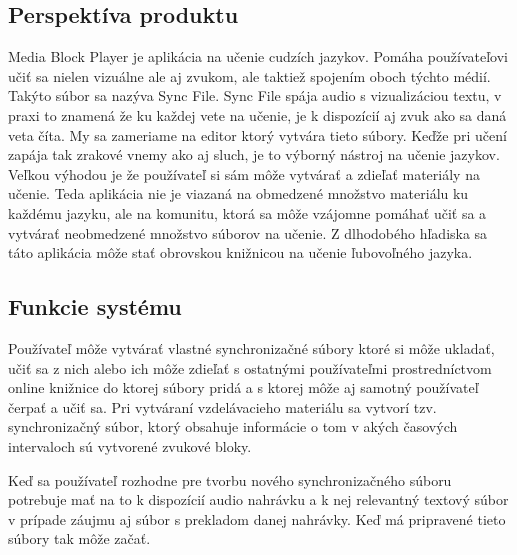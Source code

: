 \documentclass{article}
\begin{document}
\subsection{Perspektíva produktu }
Media Block Player je aplikácia na učenie cudzích jazykov. Pomáha používateľovi učiť sa nielen vizuálne ale aj zvukom, ale taktiež spojením oboch týchto médií. Takýto súbor sa nazýva Sync File. Sync File spája audio s vizualizáciou textu, v praxi to znamená že ku každej vete na učenie, je k dispozícií aj zvuk ako sa daná veta číta. My sa zameriame na editor ktorý vytvára tieto súbory. Keďže pri učení zapája tak zrakové vnemy ako aj sluch, je to výborný nástroj na učenie jazykov. Veľkou výhodou je že používateľ si sám môže vytvárať a zdieľať materiály na učenie. Teda aplikácia nie je viazaná na obmedzené množstvo materiálu ku každému jazyku, ale na komunitu, ktorá sa môže vzájomne pomáhať učiť sa a vytvárať neobmedzené množstvo súborov na učenie. Z dlhodobého hľadiska sa táto aplikácia môže stať obrovskou knižnicou na učenie ľubovoľného jazyka.

\subsection{Funkcie systému}
Používateľ môže vytvárať vlastné synchronizačné súbory ktoré si môže ukladať, učiť sa z nich alebo ich môže zdieľať s ostatnými používateľmi prostredníctvom online knižnice do ktorej súbory pridá a s ktorej môže aj samotný používateľ čerpať a učiť sa. Pri vytváraní vzdelávacieho materiálu sa vytvorí tzv. synchronizačný súbor, ktorý obsahuje informácie o tom v akých časových intervaloch sú vytvorené zvukové bloky.

Keď sa používateľ rozhodne pre tvorbu nového synchronizačného súboru potrebuje mať na to k dispozícií audio nahrávku a k nej relevantný textový súbor v prípade záujmu aj súbor s prekladom danej nahrávky. Keď má pripravené tieto súbory tak môže začať.
\end{document}

